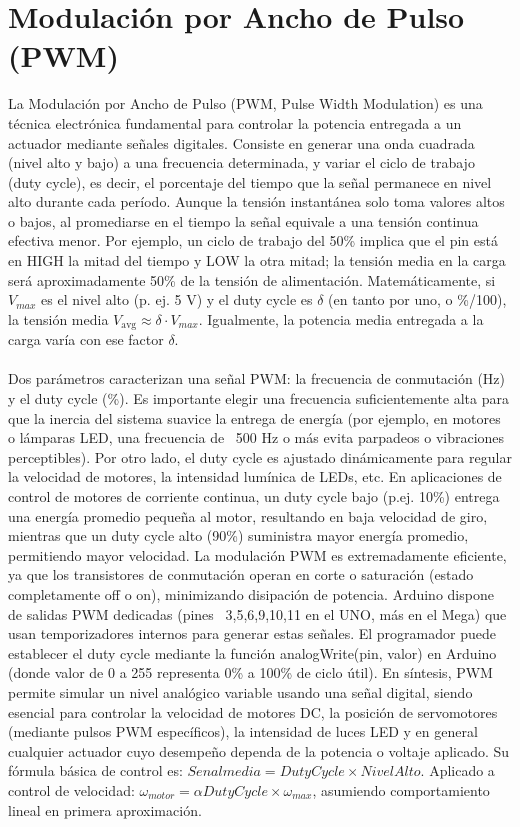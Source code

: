\section{Modulación por Ancho de Pulso (PWM)}
La Modulación por Ancho de Pulso (PWM, Pulse Width Modulation) es una técnica electrónica fundamental para controlar la potencia entregada a un actuador mediante señales digitales. Consiste en generar una onda cuadrada (nivel alto y bajo) a una frecuencia determinada, y variar el ciclo de trabajo (duty cycle), es decir, el porcentaje del tiempo que la señal permanece en nivel alto durante cada período. Aunque la tensión instantánea solo toma valores altos o bajos, al promediarse en el tiempo la señal equivale a una tensión continua efectiva menor. Por ejemplo, un ciclo de trabajo del 50\% implica que el pin está en HIGH la mitad del tiempo y LOW la otra mitad; la tensión media en la carga será aproximadamente 50\% de la tensión de alimentación. Matemáticamente, si $V_{max}$ es el nivel alto (p. ej. 5 V) y el duty cycle es $\delta$ (en tanto por uno, o \%/100), la tensión media $V_{\text{avg}} \approx \delta \cdot V_{max}$. Igualmente, la potencia media entregada a la carga varía con ese factor $\delta$. 
\\\\
Dos parámetros caracterizan una señal PWM: la frecuencia de conmutación (Hz) y el duty cycle (\%). Es importante elegir una frecuencia suficientemente alta para que la inercia del sistema suavice la entrega de energía (por ejemplo, en motores o lámparas LED, una frecuencia de ~500 Hz o más evita parpadeos o vibraciones perceptibles). Por otro lado, el duty cycle es ajustado dinámicamente para regular la velocidad de motores, la intensidad lumínica de LEDs, etc. En aplicaciones de control de motores de corriente continua, un duty cycle bajo (p.ej. 10\%) entrega una energía promedio pequeña al motor, resultando en baja velocidad de giro, mientras que un duty cycle alto (90\%) suministra mayor energía promedio, permitiendo mayor velocidad. La modulación PWM es extremadamente eficiente, ya que los transistores de conmutación operan en corte o saturación (estado completamente off o on), minimizando disipación de potencia. Arduino dispone de salidas PWM dedicadas (pines ~3,5,6,9,10,11 en el UNO, más en el Mega) que usan temporizadores internos para generar estas señales. El programador puede establecer el duty cycle mediante la función analogWrite(pin, valor) en Arduino (donde valor de 0 a 255 representa 0\% a 100\% de ciclo útil). En síntesis, PWM permite simular un nivel analógico variable usando una señal digital, siendo esencial para controlar la velocidad de motores DC, la posición de servomotores (mediante pulsos PWM específicos), la intensidad de luces LED y en general cualquier actuador cuyo desempeño dependa de la potencia o voltaje aplicado. Su fórmula básica de control es: 
$Senal media = Duty Cycle \times Nivel Alto$. 
Aplicado a control de velocidad: 
$ \omega_{motor} = \alpha Duty Cycle \times \omega_{max} $, asumiendo comportamiento lineal en primera aproximación.

